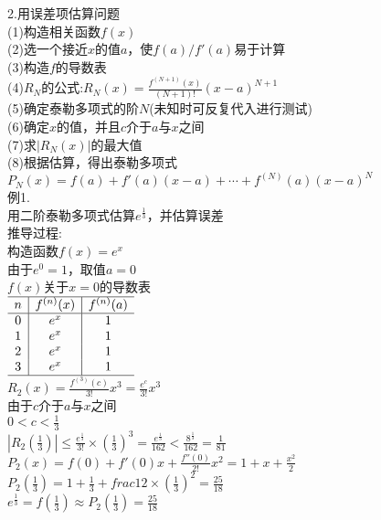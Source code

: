 2.用误差项估算问题\\
(1)构造相关函数$f(x)$\\
(2)选一个接近$x$的值$a$，使$f(a)/f'(a)$易于计算\\
(3)构造$f$的导数表\\
(4)$R_N$的公式:$\displaystyle R_N(x)=\frac{f^{(N+1)}(x)}{(N+1)!}(x-a)^{N+1}$\\
(5)确定泰勒多项式的阶$N$(未知时可反复代入进行测试)\\
(6)确定$x$的值，并且$c$介于$a$与$x$之间\\
(7)求$|R_N(x)|$的最大值\\
(8)根据估算，得出泰勒多项式$P_N(x)=f(a)+f'(a)(x-a)+\cdots+f^{(N)}(a)(x-a)^N$\\
例1.\\
用二阶泰勒多项式估算$e^{\frac{1}{3}}$，并估算误差\\
推导过程:\\
构造函数$f(x)=e^x$\\
由于$e^0=1$，取值$a=0$\\
$f(x)$关于$x=0$的导数表\\[1ex]
$\begin{array}{c|c|c}
\hline
n & f^{(n)}(x) & f^{(n)}(a)\\
\hline
0 & e^x & 1\\
1 & e^x & 1\\
2 & e^x & 1\\
3 & e^x & 1\\
\hline
\end{array}$\\[1ex]
$\displaystyle R_2(x)=\frac{f^{(3)}(c)}{3!}x^3=\frac{e^c}{3!}x^3$\\
由于$c$介于$a$与$x$之间\\
$\displaystyle 0<c<\frac{1}{3}$\\
$\displaystyle|R_2(\frac{1}{3})|\leqslant\frac{e^{\frac{1}{3}}}{3!}\times(\frac{1}{3})^3=\frac{e^{\frac{1}{3}}}{162}<\frac{8^{\frac{1}{3}}}{162}=\frac{1}{81}$\\
$\displaystyle P_2(x)=f(0)+f'(0)x+\frac{f''(0)}{2!}x^2=1+x+\frac{x^2}{2}$\\
$\displaystyle P_2(\frac{1}{3})=1+\frac{1}{3}+frac{1}{2}\times(\frac{1}{3})^2=\frac{25}{18}$\\
$\displaystyle e^{\frac{1}{3}}=f(\frac{1}{3})\approx P_2(\frac{1}{3})=\frac{25}{18}$\\[1ex]


